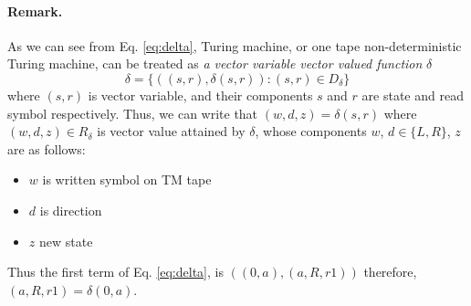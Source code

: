 \documentclass[12pt, a4paper]{report}
\begin{document}
	\paragraph{Remark.} As we can see from Eq. \eqref{eq:delta}, Turing machine, or one tape non-deterministic Turing machine, can be treated as \emph{a vector variable vector valued function} $ \delta $
	\begin{equation}\label{key}
		\delta = \{((s, r), \delta(s, r)) : (s, r) \in D_{\delta} \} 
	\end{equation}
	where $ (s, r) $ is vector variable, and their components $ s $ and $ r $ are state and read symbol respectively. Thus, we can write that $ (w, d, z) = \delta(s, r) $ where $ (w, d, z) \in R_{\delta} $ is vector value attained by $ \delta $, whose components   $ w $, $ d \in \{L, R\} $, $ z $ are as follows:
	\begin{itemize}
		\item $ w $ is  written symbol on TM tape
		\item $ d $ is direction
		\item $ z $ new state
	\end{itemize}
	Thus the first term of Eq. \eqref{eq:delta}, is $ ((0, a), (a, R, r1)) $ therefore, $ (a, R, r1) =\delta(0, a) $.
	
\end{document}

